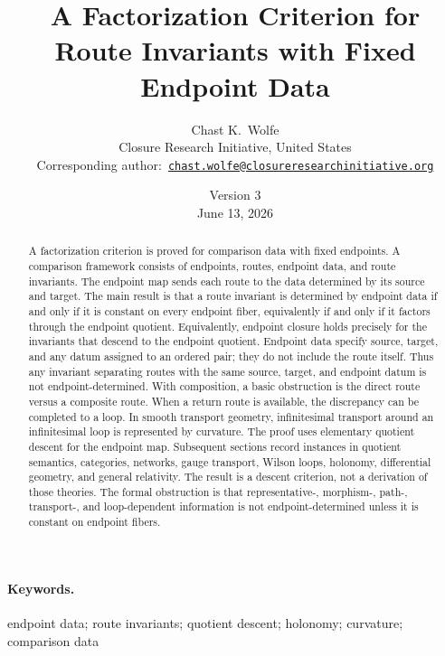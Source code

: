 \documentclass[12pt]{article}
\begin{document}
\title{A Factorization Criterion for Route Invariants with Fixed Endpoint Data}
\author{Chast K.~Wolfe\\[4pt]
\small Closure Research Initiative, United States\\[2pt]
\small Corresponding author:~\href{mailto:chast.wolfe@closureresearchinitiative.org}{\texttt{chast.wolfe@closureresearchinitiative.org}}}
\date{Version 3\\June 13, 2026}
\maketitle

\begin{abstract}
\noindent
A factorization criterion is proved for comparison data with fixed
endpoints. A comparison framework consists of endpoints, routes,
endpoint data, and route invariants. The endpoint map sends each route
to the data determined by its source and target. The main result is that
a route invariant is determined by endpoint data if and only if it is
constant on every endpoint fiber, equivalently if and only if it factors
through the endpoint quotient. Equivalently, endpoint closure holds
precisely for the invariants that descend to the endpoint quotient.
Endpoint data specify source, target, and any datum assigned to an
ordered pair; they do not include the route itself. Thus any invariant
separating routes with the same source, target, and endpoint datum is not
endpoint-determined. With composition, a basic obstruction is the direct
route versus a composite route. When a return route is available, the
discrepancy can be completed to a loop. In smooth transport geometry,
infinitesimal transport around an infinitesimal loop is represented by
curvature. The proof uses elementary quotient descent for the endpoint
map. Subsequent sections record instances in quotient semantics,
categories, networks, gauge transport, Wilson loops, holonomy,
differential geometry, and general relativity. The result is a descent
criterion, not a derivation of those theories. The formal obstruction is
that representative-, morphism-, path-, transport-, and loop-dependent
information is not endpoint-determined unless it is constant on endpoint
fibers.
\end{abstract}

\paragraph{Keywords.}
endpoint data; route invariants; quotient descent; holonomy;
curvature; comparison data
\end{document}
